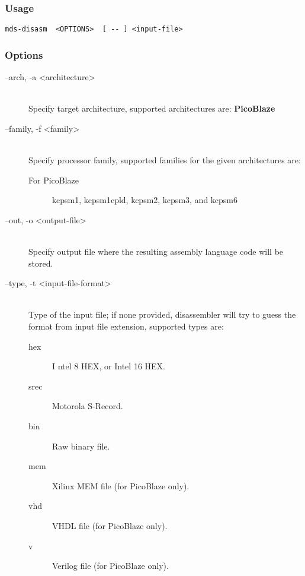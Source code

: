         \subsubsection{Usage}
            \verb'mds-disasm  <OPTIONS>  [ -- ] <input-file>'

        \subsubsection{Options}
            \begin{description}
                \item[--arch, -a <architecture>]~\\
                    Specify target architecture, supported architectures are: \textbf{PicoBlaze}

                \item[--family, -f <family>]~\\
                    Specify processor family, supported families for the given architectures are:
                    \begin{description}
                        \item[For PicoBlaze]
                            kcpsm1, kcpsm1cpld, kcpsm2, kcpsm3, and kcpsm6
                    \end{description}

                \item[--out, -o <output-file>]~\\
                    Specify output file where the resulting assembly language code will be stored.

                \item[--type, -t <input-file-format>]~\\
                    Type of the input file; if none provided, disassembler will try to guess the format from input file extension, supported types are:
                    \begin{description}
                        \item [hex]I ntel 8 HEX, or Intel 16 HEX.
                        \item [srec] Motorola S-Record.
                        \item [bin] Raw binary file.
                        \item [mem] Xilinx MEM file (for PicoBlaze only).
                        \item [vhd] VHDL file (for PicoBlaze only).
                        \item [v] Verilog file (for PicoBlaze only).
                    \end{description}


\end{description}
